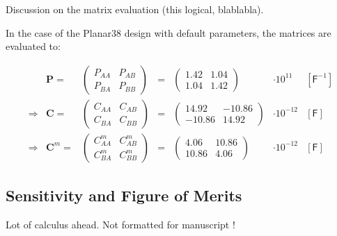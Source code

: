 { \color{blue} 
Discussion on the matrix evaluation (this logical, blablabla).
}

In the case of the Planar38 design with default parameters, the matrices are evaluated to:

\begin{equation} 
\label{eq:planar38-matrix-evaluation}
\begin{array}{rrccclc}
 & \bm{P} = &
 \begin{pmatrix}
P_{AA} & P_{AB} \\ 
P_{BA} & P_{BB}
\end{pmatrix}
&=&
\begin{pmatrix}
1.42 & 1.04 \\
1.04 & 1.42
\end{pmatrix}
& \cdot 10^{11} & [\textsf{F}^{-1}] \\
\Rightarrow & \bm{C} = &
\begin{pmatrix}
C_{AA} & C_{AB} \\ 
C_{BA} & C_{BB}
\end{pmatrix}
&=&
\begin{pmatrix}
14.92 & -10.86 \\
-10.86 & 14.92
\end{pmatrix}
& \cdot 10^{-12} & [\textsf{F}] \\
\Rightarrow & \bm{C}^m = &
\begin{pmatrix}
C_{AA}^m & C_{AB}^m \\ 
C_{BA}^m & C_{BB}^m
\end{pmatrix}
&=&
\begin{pmatrix}
4.06 & 10.86 \\
10.86 & 4.06
\end{pmatrix}
& \cdot 10^{-12} & [\textsf{F}]
\end{array}
\end{equation}

\subsection{Sensitivity and Figure of Merits}

{\color{red} Lot of calculus ahead. Not formatted for manuscript !}

